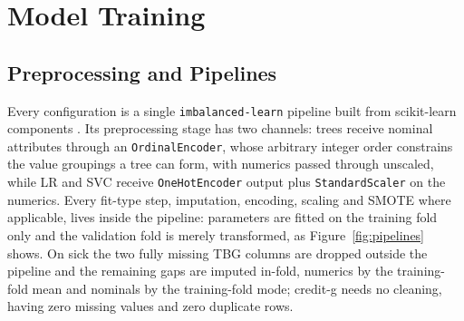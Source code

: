 \section{Model Training}
\label{sec:training}

\subsection{Preprocessing and Pipelines}
Every configuration is a single \texttt{imbalanced-learn} pipeline
\cite{lemaitre2017imblearn} built from scikit-learn components
\cite{pedregosa2011sklearn}. Its preprocessing stage has two
channels: trees receive nominal attributes through an
\texttt{OrdinalEncoder}, whose arbitrary integer order constrains the
value groupings a tree can form, with numerics passed through
unscaled, while LR and SVC receive \texttt{OneHotEncoder} output plus
\texttt{StandardScaler} on the numerics. Every fit-type step,
imputation, encoding, scaling and SMOTE where applicable, lives
inside the pipeline: parameters are fitted on the training fold only
and the validation fold is merely transformed, as
Figure~\ref{fig:pipelines} shows. On sick the two fully missing TBG
columns are dropped outside the pipeline and the remaining gaps are
imputed in-fold, numerics by the training-fold mean and nominals by
the training-fold mode; credit-g needs no cleaning, having zero
missing values and zero duplicate rows.

